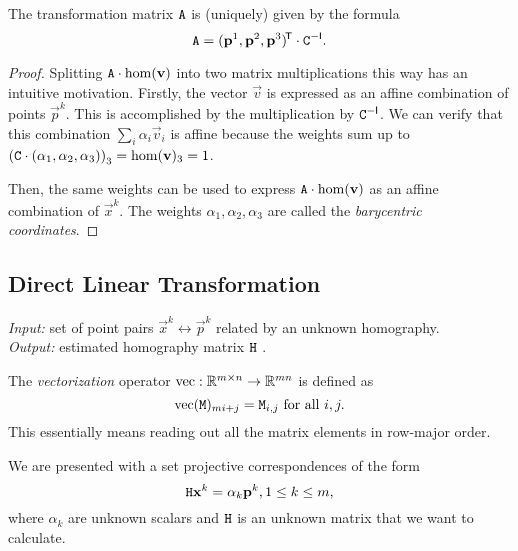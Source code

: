 \begin{lemma} \label{l:algo-aff}
The transformation matrix $\mathtt{A}$ is (uniquely) given by the formula
$$\mathtt{A} = (\mathbf{p}^1, \mathbf{p}^2, \mathbf{p}^3)^{\!\mathsf{T}} \cdot \mathtt{C} ^{-\mathsf{I}}.$$
\end{lemma}

\begin{proof}
Splitting $\mathtt{A} \cdot \mathrm{hom}(\mathbf{v})$ into two matrix multiplications this way has an intuitive motivation.
Firstly, the vector $\vec v$ is expressed as an affine combination of points $\vec p^k$.
This is accomplished by the multiplication by $\mathtt{C} ^{-\mathsf{I}}$.
We can verify that this combination $\sum_i \alpha_i \vec v_i$ is affine because the weights sum up to $\left(\mathtt{C} \cdot (\alpha_1, \alpha_2, \alpha_3) \right)_3 = \mathrm{hom}(\mathbf{v})_3 = 1$.

Then, the same weights can be used to express $\mathtt{A} \cdot \mathrm{hom}(\mathbf{v})$ as an affine combination of $\vec x^k$.
The weights $\alpha_1, \alpha_2, \alpha_3$ are called the \textit{barycentric coordinates}.
\end{proof}

\subsection{Direct Linear Transformation}

\textit{Input:} set of point pairs $\vec x^k \leftrightarrow \vec p^k$ related by an unknown homography.\\
\textit{Output:} estimated homography matrix $\mathtt{H}$ .\\

\begin{definition}
The \textit{vectorization} operator $\mathrm{vec} : \mathbb{R}^{m \times n} \to \mathbb{R}^{mn}$ is defined as
$$\mathrm{vec}(\mathtt{M})_{m i + j} = \mathtt{M}_{i,j} \textrm{ for all } i, j.$$
This essentially means reading out all the matrix elements in row-major order.
\end{definition}

We are presented with a set projective correspondences of the form
\begin{equation} \label{e:homography-input}
\mathtt{H} \mathbf{x}^k = \alpha_k \mathbf{p}^k, 1 \leq k \leq m,
\end{equation}
where $\alpha_k$ are unknown scalars and $\mathtt{H}$ is an unknown matrix that we want to calculate.

